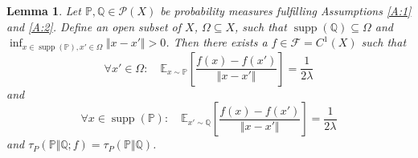 \documentclass{article}
\DeclareMathOperator{\supp}{supp}
\newtheorem{lemma}{Lemma}
\begin{document}
 \begin{lemma}\label{L:existence}
  Let $\mathbb P,\mathbb Q\in\mathcal P(X)$ be probability measures fulfilling Assumptions \ref{A:1} and \ref{A:2}.
  Define an open subset of $X$, $\Omega\subseteq X$, such that $\supp(\mathbb Q)\subseteq\Omega$ and $\inf_{x\in\supp(\mathbb P),x'\in\Omega}\Vert x-x'\Vert>0$.
  Then there exists a $f\in\mathcal F=C^1(X)$ such that
  \begin{equation}\label{E:slope_strict}
   \forall x'\in\Omega:\quad\mathbb E_{x\sim\mathbb P}\left[\frac{f(x)-f(x')}{\Vert x-x'\Vert}\right]=\frac {1}{2\lambda}
  \end{equation}
  and
  \begin{equation}\label{E:slope_strict_p}
   \forall x\in\supp(\mathbb P):\quad\mathbb E_{x'\sim\mathbb Q}\left[\frac{f(x)-f(x')}{\Vert x-x'\Vert}\right]=\frac {1}{2\lambda}
  \end{equation}
  and $\tau_P(\mathbb P\Vert\mathbb Q;f)=\tau_P(\mathbb P\Vert\mathbb Q)$.
 \end{lemma}
\end{document}
